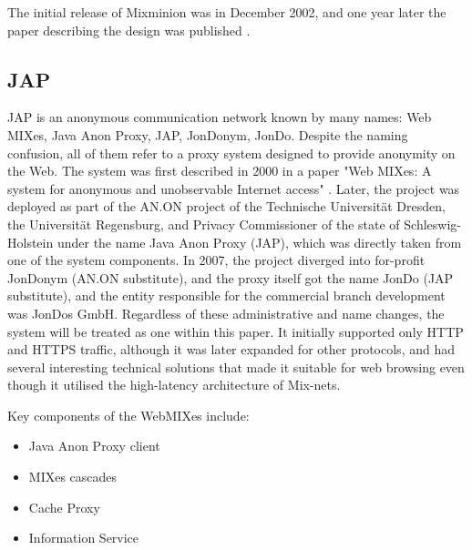 The initial release of Mixminion was in December 2002, and one year later the paper describing the design was published \cite{mixminion}.

\subsection{JAP}
JAP is an anonymous communication network known by many names: Web MIXes, Java Anon Proxy, JAP, JonDonym, JonDo. Despite the naming confusion, all of them refer to a proxy system designed to provide anonymity on the Web. The system was first described in 2000 in a paper "Web MIXes: A system for anonymous and unobservable Internet access" \cite{web-mixes}. Later, the project was deployed as part of the AN.ON project of the Technische Universität Dresden, the Universität Regensburg, and Privacy Commissioner of the state of Schleswig-Holstein under the name Java Anon Proxy (JAP), which was directly taken from one of the system components. In 2007, the project diverged into for-profit JonDonym (AN.ON substitute), and the proxy itself got the name JonDo (JAP substitute), and the entity responsible for the commercial branch development was JonDos GmbH. Regardless of these administrative and name changes, the system will be treated as one within this paper. It initially supported only HTTP and HTTPS traffic, although it was later expanded for other protocols, and had several interesting technical solutions that made it suitable for web browsing even though it utilised the high-latency architecture of Mix-nets.

Key components of the WebMIXes include: 
\begin{itemize}
    \item Java Anon Proxy client
    \item MIXes cascades
    \item Cache Proxy
    \item Information Service
\end{itemize}

